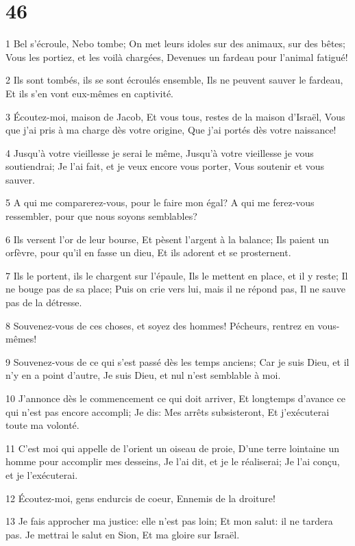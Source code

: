 \chapter{46}

\par 1 Bel s'écroule, Nebo tombe; On met leurs idoles sur des animaux, sur des bêtes; Vous les portiez, et les voilà chargées, Devenues un fardeau pour l'animal fatigué!
\par 2 Ils sont tombés, ils se sont écroulés ensemble, Ils ne peuvent sauver le fardeau, Et ils s'en vont eux-mêmes en captivité.
\par 3 Écoutez-moi, maison de Jacob, Et vous tous, restes de la maison d'Israël, Vous que j'ai pris à ma charge dès votre origine, Que j'ai portés dès votre naissance!
\par 4 Jusqu'à votre vieillesse je serai le même, Jusqu'à votre vieillesse je vous soutiendrai; Je l'ai fait, et je veux encore vous porter, Vous soutenir et vous sauver.
\par 5 A qui me comparerez-vous, pour le faire mon égal? A qui me ferez-vous ressembler, pour que nous soyons semblables?
\par 6 Ils versent l'or de leur bourse, Et pèsent l'argent à la balance; Ils paient un orfèvre, pour qu'il en fasse un dieu, Et ils adorent et se prosternent.
\par 7 Ils le portent, ils le chargent sur l'épaule, Ils le mettent en place, et il y reste; Il ne bouge pas de sa place; Puis on crie vers lui, mais il ne répond pas, Il ne sauve pas de la détresse.
\par 8 Souvenez-vous de ces choses, et soyez des hommes! Pécheurs, rentrez en vous-mêmes!
\par 9 Souvenez-vous de ce qui s'est passé dès les temps anciens; Car je suis Dieu, et il n'y en a point d'autre, Je suis Dieu, et nul n'est semblable à moi.
\par 10 J'annonce dès le commencement ce qui doit arriver, Et longtemps d'avance ce qui n'est pas encore accompli; Je dis: Mes arrêts subsisteront, Et j'exécuterai toute ma volonté.
\par 11 C'est moi qui appelle de l'orient un oiseau de proie, D'une terre lointaine un homme pour accomplir mes desseins, Je l'ai dit, et je le réaliserai; Je l'ai conçu, et je l'exécuterai.
\par 12 Écoutez-moi, gens endurcis de coeur, Ennemis de la droiture!
\par 13 Je fais approcher ma justice: elle n'est pas loin; Et mon salut: il ne tardera pas. Je mettrai le salut en Sion, Et ma gloire sur Israël.

